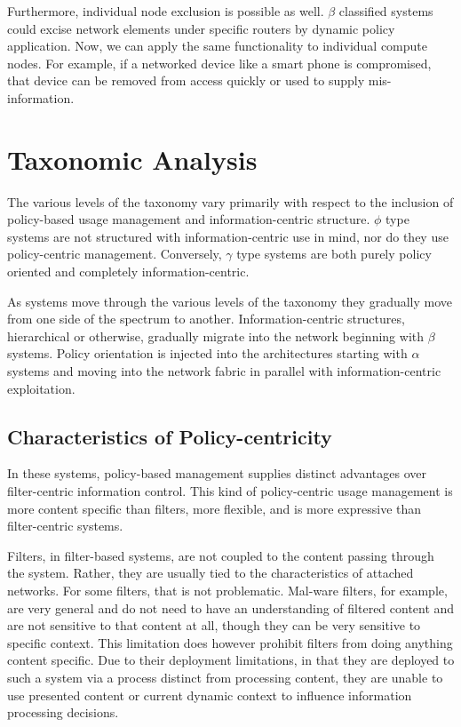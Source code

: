 Furthermore, individual node exclusion is possible as well. $\beta$ classified systems could excise network elements under specific routers by dynamic policy application.  Now, we can apply the same functionality to individual compute nodes.  For example, if a networked device like a smart phone is compromised, that device can be removed from access quickly or used to supply mis-information.

\section{Taxonomic Analysis}
The various levels of the taxonomy vary primarily with respect to the inclusion of policy-based usage management and information-centric structure.  $\phi$ type systems are not structured with information-centric use in mind, nor do they use policy-centric management.  Conversely, $\gamma$ type systems are both purely policy oriented and completely information-centric.

As systems move through the various levels of the taxonomy they gradually move from one side of the spectrum to another.  Information-centric structures, hierarchical or otherwise, gradually migrate into the network beginning with $\beta$ systems.  Policy orientation is injected into the architectures starting with $\alpha$ systems and moving into the network fabric in parallel with information-centric exploitation.

\subsection{Characteristics of Policy-centricity}
In these systems, policy-based management supplies distinct advantages over filter-centric information control.  This kind of policy-centric usage management is more content specific than filters, more flexible, and is more expressive than filter-centric systems.

Filters, in filter-based systems, are not coupled to the content passing through the system.  Rather, they are usually tied to the characteristics of attached networks.  For some filters, that is not problematic.  Mal-ware filters, for example, are very general and do not need to have an understanding of filtered content and are not sensitive to that content at all, though they can be very sensitive to specific context.  This limitation does however prohibit filters from doing anything content specific.  Due to their deployment limitations, in that they are deployed to such a system via a process distinct from processing content, they are unable to use presented content or current dynamic context to influence information processing decisions.

